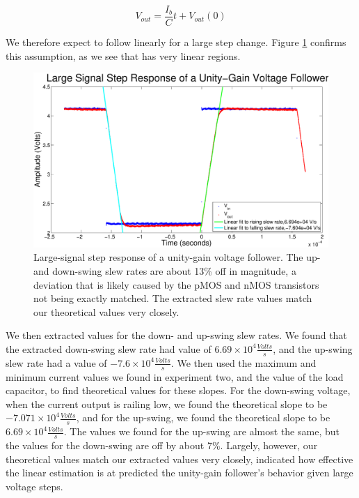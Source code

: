 \begin{equation}
V_{out} = \frac{I_b}{C}t + V_{out}(0)
\end{equation}	

We therefore expect \Vout to follow \Vin linearly for a large step change. Figure \ref{fig:exp3p1} confirms this assumption, as we see that \Vout has very linear regions.

\begin{figure}[H]
\centering
\includegraphics[width=\linewidth]{../Figures/Exp3P1.eps}
\caption{Large-signal step response of a unity-gain voltage follower. The up- and down-swing slew rates are about 13\% off in magnitude, a deviation that is likely caused by the pMOS and nMOS transistors not being exactly matched. The extracted slew rate values match our theoretical values very closely.}
\label{fig:exp3p1}
\end{figure}

We then extracted values for the down- and up-swing slew rates. We found that the extracted down-swing slew rate had value of $6.69 \times 10^4 \frac{Volts}{s}$, and the up-swing slew rate had a value of $-7.6 \times 10^4 \frac{Volts}{s}$. We then used the maximum and minimum current values we found in experiment two, and the value of the load capacitor, to find theoretical values for these slopes. For the down-swing voltage, when the current output is railing low, we found the theoretical slope to be $-7.071 \times 10^4 \frac{Volts}{s}$, and for the up-swing, we found the theoretical slope to be $6.69 \times 10^4 \frac{Volts}{s}$. The values we found for the up-swing are almost the same, but the values for the down-swing are off by about 7\%. Largely, however, our theoretical values match our extracted values very closely, indicated how effective the linear estimation is at predicted the unity-gain follower's behavior given large voltage steps.